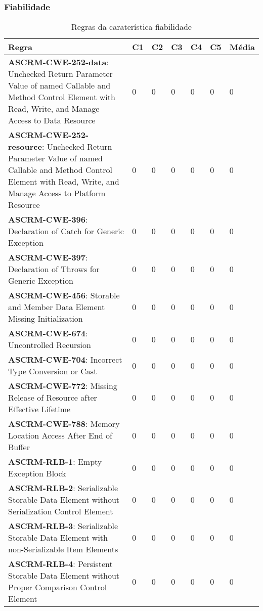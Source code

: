 \documentclass[openany,10pt,a4paper]{article}
\begin{document}
\subsubsection{Fiabilidade}

\begin{longtable}{p{3.2in}|p{0.28in}|p{0.28in}|p{0.28in}|p{0.28in}|p{0.28in}|p{0.35in}}
	\caption{Regras da caraterística fiabilidade}
	\label{variability_impl_mech}
	\endhead
	\hline	
		\textbf{Regra} & \textbf{C1} & \textbf{C2} & \textbf{C3} & \textbf{C4} & \textbf{C5} & \textbf{Média} \\ \hline
		\textbf{ASCRM-CWE-252-data}: Unchecked Return Parameter Value of named Callable and Method Control Element with Read, Write, and Manage Access to Data Resource & 0 & 0 & 0 & 0 & 0 & 0 \\ \hline
\textbf{ASCRM-CWE-252-resource}: Unchecked Return Parameter Value of named Callable and Method Control Element with Read, Write, and Manage Access to Platform Resource & 0 & 0 & 0 & 0 & 0 & 0 \\ \hline
\textbf{ASCRM-CWE-396}: Declaration of Catch for Generic Exception & 0 & 0 & 0 & 0 & 0 & 0 \\ \hline
\textbf{ASCRM-CWE-397}: Declaration of Throws for Generic Exception & 0 & 0 & 0 & 0 & 0 & 0 \\ \hline
\textbf{ASCRM-CWE-456}: Storable and Member Data Element Missing Initialization & 0 & 0 & 0 & 0 & 0 & 0 \\ \hline
\textbf{ASCRM-CWE-674}: Uncontrolled Recursion & 0 & 0 & 0 & 0 & 0 & 0 \\ \hline
\textbf{ASCRM-CWE-704}: Incorrect Type Conversion or Cast & 0 & 0 & 0 & 0 & 0 & 0 \\ \hline
\textbf{ASCRM-CWE-772}: Missing Release of Resource after Effective Lifetime & 0 & 0 & 0 & 0 & 0 & 0 \\ \hline
\textbf{ASCRM-CWE-788}: Memory Location Access After End of Buffer & 0 & 0 & 0 & 0 & 0 & 0 \\ \hline
\textbf{ASCRM-RLB-1}: Empty Exception Block & 0 & 0 & 0 & 0 & 0 & 0 \\ \hline
\textbf{ASCRM-RLB-2}: Serializable Storable Data Element without Serialization Control Element & 0 & 0 & 0 & 0 & 0 & 0 \\ \hline
\textbf{ASCRM-RLB-3}: Serializable Storable Data Element with non-Serializable Item Elements & 0 & 0 & 0 & 0 & 0 & 0 \\ \hline
\textbf{ASCRM-RLB-4}: Persistent Storable Data Element without Proper Comparison Control Element & 0 & 0 & 0 & 0 & 0 & 0 \\ \hline

\end{longtable}
\end{document}
